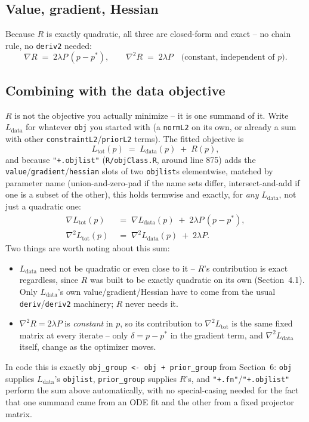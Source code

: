 \documentclass[11pt]{article}
\newcommand{\code}[1]{\texttt{#1}}
\newcommand{\file}[1]{\textcolor{black!60}{\texttt{#1}}}
\begin{document}
\subsection*{Value, gradient, Hessian}

Because $R$ is exactly quadratic, all three are closed-form and exact -- no
chain rule, no \code{deriv2} needed:
\begin{equation}
  \nabla R \;=\; 2\lambda P\,(p-p^*), \qquad \nabla^2 R \;=\; 2\lambda P \quad\text{(constant, independent of $p$).}
\end{equation}

\subsection*{Combining with the data objective}

$R$ is not the objective you actually minimize -- it is one summand of it.
Write $L_{\mathrm{data}}$ for whatever \code{obj} you started with (a
\code{normL2} on its own, or already a sum with other
\code{constraintL2}/\code{priorL2} terms). The fitted objective is
\begin{equation}
  L_{\mathrm{tot}}(p) \;=\; L_{\mathrm{data}}(p) \;+\; R(p),
\end{equation}
and because \code{"+.objlist"} (\file{R/objClass.R}, around line 875) adds
the \code{value}/\code{gradient}/\code{hessian} slots of two \code{objlist}s
elementwise, matched by parameter name (union-and-zero-pad if the name sets
differ, intersect-and-add if one is a subset of the other), this holds
termwise and exactly, for \emph{any} $L_{\mathrm{data}}$, not just a
quadratic one:
\begin{align}
  \nabla L_{\mathrm{tot}}(p) &\;=\; \nabla L_{\mathrm{data}}(p) \;+\; 2\lambda P\,(p-p^*), \\
  \nabla^2 L_{\mathrm{tot}}(p) &\;=\; \nabla^2 L_{\mathrm{data}}(p) \;+\; 2\lambda P.
\end{align}
Two things are worth noting about this sum:
\begin{itemize}
  \item $L_{\mathrm{data}}$ need not be quadratic or even close to it -- $R$'s
  contribution is exact regardless, since $R$ was built to be exactly
  quadratic on its own (Section~4.1). Only $L_{\mathrm{data}}$'s own
  value/gradient/Hessian have to come from the usual \code{deriv}/\code{deriv2}
  machinery; $R$ never needs it.
  \item $\nabla^2 R = 2\lambda P$ is \emph{constant} in $p$, so its contribution
  to $\nabla^2 L_{\mathrm{tot}}$ is the same fixed matrix at every iterate --
  only $\delta = p-p^*$ in the gradient term, and $\nabla^2 L_{\mathrm{data}}$
  itself, change as the optimizer moves.
\end{itemize}
In code this is exactly \code{obj\_group <- obj + prior\_group} from
Section~6: \code{obj} supplies $L_{\mathrm{data}}$'s \code{objlist},
\code{prior\_group} supplies $R$'s, and \code{"+.fn"}/\code{"+.objlist"}
perform the sum above automatically, with no special-casing needed for the
fact that one summand came from an ODE fit and the other from a fixed
projector matrix.
\end{document}

